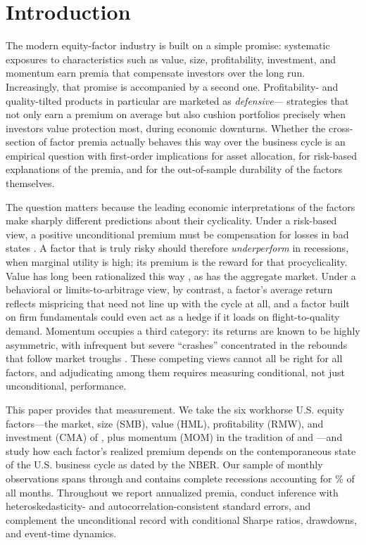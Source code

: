 \documentclass[12pt]{article}
\begin{document}
\section{Introduction}

The modern equity-factor industry is built on a simple promise: systematic
exposures to characteristics such as value, size, profitability, investment,
and momentum earn premia that compensate investors over the long run.
Increasingly, that promise is accompanied by a second one. Profitability- and
quality-tilted products in particular are marketed as \emph{defensive}---
strategies that not only earn a premium on average but also cushion portfolios
precisely when investors value protection most, during economic downturns.
Whether the cross-section of factor premia actually behaves this way over the
business cycle is an empirical question with first-order implications for asset
allocation, for risk-based explanations of the premia, and for the
out-of-sample durability of the factors themselves.

The question matters because the leading economic interpretations of the
factors make sharply different predictions about their cyclicality. Under a
risk-based view, a positive unconditional premium must be compensation for
losses in bad states \citep{cochrane2011presidential}. A factor that is truly
risky should therefore \emph{underperform} in recessions, when marginal utility
is high; its premium is the reward for that procyclicality. Value has long been
rationalized this way \citep{fama1993common,petkova2005value,gulen2011value},
as has the aggregate market. Under a behavioral or
limits-to-arbitrage view, by contrast, a factor's average return reflects
mispricing that need not line up with the cycle at all, and a factor built on
firm fundamentals could even act as a hedge if it loads on flight-to-quality
demand. Momentum occupies a third category: its returns are known to be highly
asymmetric, with infrequent but severe ``crashes'' concentrated in the rebounds
that follow market troughs \citep{daniel2016momentum,barroso2015momentum}.
These competing views cannot all be right for all factors, and adjudicating
among them requires measuring conditional, not just unconditional, performance.

This paper provides that measurement. We take the six workhorse U.S. equity
factors---the market, size (SMB), value (HML), profitability (RMW), and
investment (CMA) of \citet{fama2015five}, plus momentum (MOM) in the tradition
of \citet{jegadeesh1993returns} and \citet{carhart1997persistence}---and study
how each factor's realized premium depends on the contemporaneous state of the
U.S. business cycle as dated by the NBER. Our sample of \nMonths{} monthly
observations spans \sampStart{} through \sampEnd{} and contains \nRecessions{}
complete recessions accounting for \pctRec\% of all months. Throughout we
report annualized premia, conduct inference with \citet{newey1987simple}
heteroskedasticity- and autocorrelation-consistent standard errors, and
complement the unconditional record with conditional Sharpe ratios, drawdowns,
and event-time dynamics.
\end{document}
